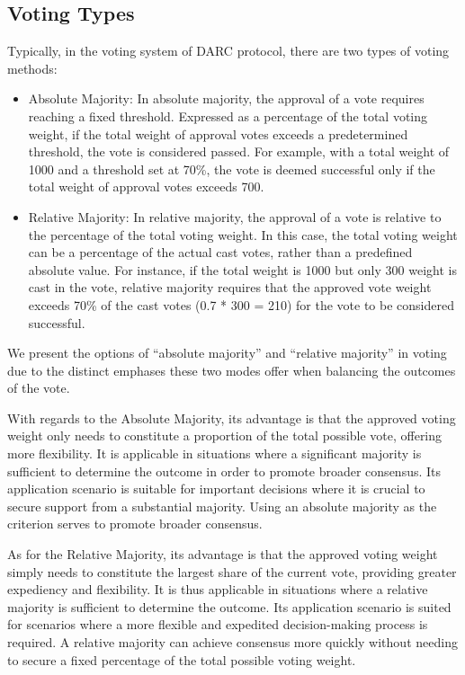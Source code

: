 \documentclass[main.tex]{subfiles}
\begin{document}
\subsection{Voting Types}

Typically, in the voting system of DARC protocol, there are two types of voting methods:

\begin{itemize}
    \item Absolute Majority: In absolute majority, the approval of a vote requires reaching a fixed threshold. Expressed as a percentage of the total voting weight, if the total weight of approval votes exceeds a predetermined threshold, the vote is considered passed. For example, with a total weight of 1000 and a threshold set at 70\%, the vote is deemed successful only if the total weight of approval votes exceeds 700.

    \item Relative Majority: In relative majority, the approval of a vote is relative to the percentage of the total voting weight. In this case, the total voting weight can be a percentage of the actual cast votes, rather than a predefined absolute value. For instance, if the total weight is 1000 but only 300 weight is cast in the vote, relative majority requires that the approved vote weight exceeds 70\% of the cast votes (0.7 * 300 = 210) for the vote to be considered successful.
\end{itemize}


We present the options of ``absolute majority'' and ``relative majority'' in voting due to the distinct emphases these two modes offer when balancing the outcomes of the vote.

With regards to the Absolute Majority, its advantage is that the approved voting weight only needs to constitute a proportion of the total possible vote, offering more flexibility. It is applicable in situations where a significant majority is sufficient to determine the outcome in order to promote broader consensus. Its application scenario is suitable for important decisions where it is crucial to secure support from a substantial majority. Using an absolute majority as the criterion serves to promote broader consensus.

As for the Relative Majority, its advantage is that the approved voting weight simply needs to constitute the largest share of the current vote, providing greater expediency and flexibility. It is thus applicable in situations where a relative majority is sufficient to determine the outcome. Its application scenario is suited for scenarios where a more flexible and expedited decision-making process is required. A relative majority can achieve consensus more quickly without needing to secure a fixed percentage of the total possible voting weight.
\end{document}
